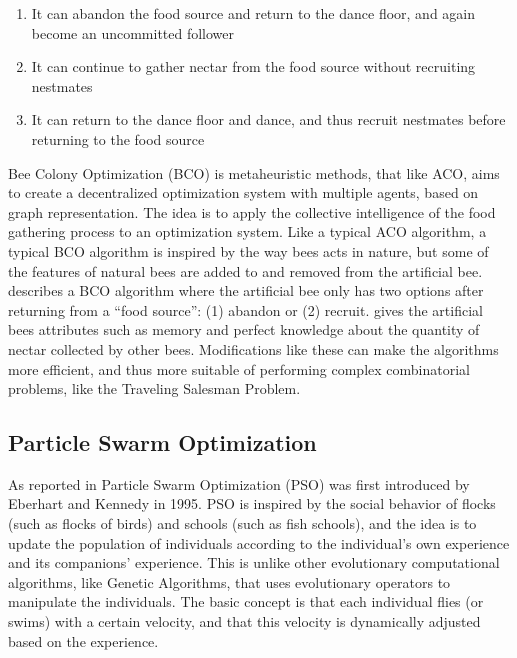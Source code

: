 \begin{enumerate}
  \item It can abandon the food source and return to the dance floor, and again become an uncommitted follower
  \item It can continue to gather nectar from the food source without recruiting nestmates
  \item It can return to the dance floor and dance, and thus recruit nestmates before returning to the food source
\end{enumerate}

Bee Colony Optimization (BCO) is metaheuristic methods, that like ACO, aims to create a decentralized optimization system with multiple agents, based on graph representation. The idea is to apply the collective intelligence of the food gathering process to an optimization system. Like a typical ACO algorithm, a typical BCO algorithm is inspired by the way bees acts in nature, but some of the features of natural bees are added to and removed from the artificial bee. \citet{nikolic14} describes a BCO algorithm where the artificial bee only has two options after returning from a ``food source'': (1) abandon or (2) recruit. \citet{lucic03} gives the artificial bees attributes such as memory and perfect knowledge about the quantity of nectar collected by other bees. Modifications like these can make the algorithms more efficient, and thus more suitable of performing complex combinatorial problems, like the Traveling Salesman Problem. 


\subsection{Particle Swarm Optimization}
As reported in \citet{shi99} Particle Swarm Optimization (PSO) was first introduced by Eberhart and Kennedy in 1995. PSO is inspired by the social behavior of flocks (such as flocks of birds) and schools (such as fish schools), and the idea is to update the population of individuals according to the individual's own experience and its companions' experience. This is unlike other evolutionary computational algorithms, like Genetic Algorithms, that uses evolutionary operators to manipulate the individuals. The basic concept is that each individual flies (or swims) with a certain velocity, and that this velocity is dynamically adjusted based on the experience. \citep{shi99}



